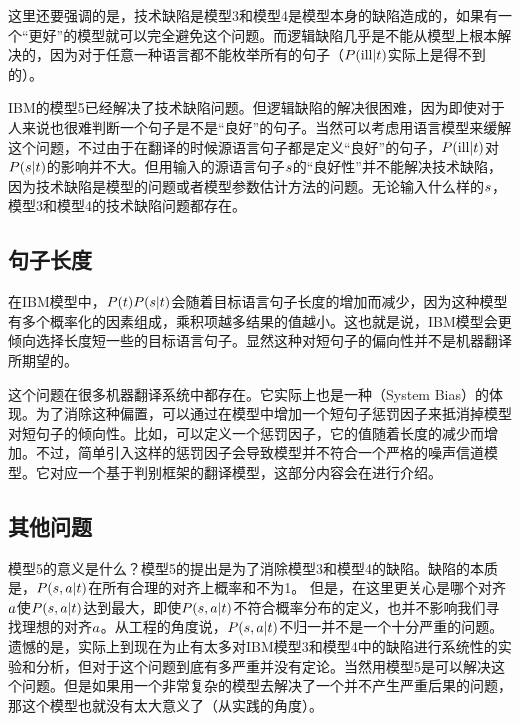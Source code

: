 \parinterval 这里还要强调的是，技术缺陷是模型3和模型4是模型本身的缺陷造成的，如果有一个“更好”的模型就可以完全避免这个问题。而逻辑缺陷几乎是不能从模型上根本解决的，因为对于任意一种语言都不能枚举所有的句子（${P}({\textrm{ill}|{t}})$实际上是得不到的）。

\parinterval IBM的模型5已经解决了技术缺陷问题。但逻辑缺陷的解决很困难，因为即使对于人来说也很难判断一个句子是不是“良好”的句子。当然可以考虑用语言模型来缓解这个问题，不过由于在翻译的时候源语言句子都是定义“良好”的句子，${P}({\textrm{ill}|{t}})$对${P}({s}| {t})$的影响并不大。但用输入的源语言句子${s}$的“良好性”并不能解决技术缺陷，因为技术缺陷是模型的问题或者模型参数估计方法的问题。无论输入什么样的${s}$，模型3和模型4的技术缺陷问题都存在。


\subsection{句子长度}

\parinterval 在IBM模型中，${P}({t}){P}({s}| {t})$会随着目标语言句子长度的增加而减少，因为这种模型有多个概率化的因素组成，乘积项越多结果的值越小。这也就是说，IBM模型会更倾向选择长度短一些的目标语言句子。显然这种对短句子的偏向性并不是机器翻译所期望的。

\parinterval 这个问题在很多机器翻译系统中都存在。它实际上也是一种{\small{}}（System Bias）的体现。为了消除这种偏置，可以通过在模型中增加一个短句子惩罚因子来抵消掉模型对短句子的倾向性。比如，可以定义一个惩罚因子，它的值随着长度的减少而增加。不过，简单引入这样的惩罚因子会导致模型并不符合一个严格的噪声信道模型。它对应一个基于判别框架的翻译模型，这部分内容会在{\chapterseven}进行介绍。


\subsection{其他问题}

\parinterval 模型5的意义是什么？模型5的提出是为了消除模型3和模型4的缺陷。缺陷的本质是，${P}({s},{a}| {t})$在所有合理的对齐上概率和不为1。 但是，在这里更关心是哪个对齐${a}$使${P}({s},{a}| {t})$达到最大，即使${P}({s},{a}|{t})$不符合概率分布的定义，也并不影响我们寻找理想的对齐${a}$。从工程的角度说，${P}({s},{a}| {t})$不归一并不是一个十分严重的问题。遗憾的是，实际上到现在为止有太多对IBM模型3和模型4中的缺陷进行系统性的实验和分析，但对于这个问题到底有多严重并没有定论。当然用模型5是可以解决这个问题。但是如果用一个非常复杂的模型去解决了一个并不产生严重后果的问题，那这个模型也就没有太大意义了（从实践的角度）。


